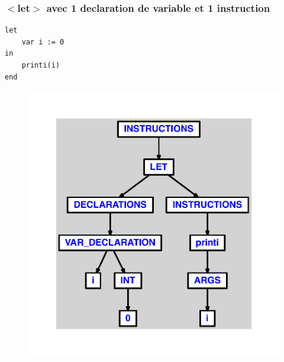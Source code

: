 \documentclass{article}
\begin{document}
\subsubsection{$ < $let$ > $ avec 1 declaration de variable et 1 instruction}
\begin{lstlisting}
let
	var i := 0
in
	printi(i)
end
\end{lstlisting}
\newpage
\begin{figure}[H]
\centering
\includegraphics[max width=\textwidth]{ast/ast_275.pdf}
\end{figure}
\newpage
\end{document}
